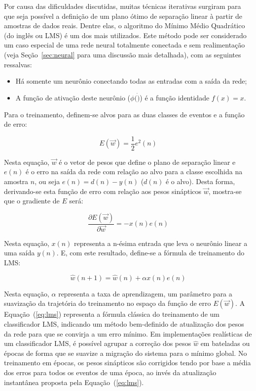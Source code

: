 Por causa das dificuldades discutidas, muitas técnicas iterativas surgiram
para que seja possível a definição de um plano ótimo de separação linear à
partir de amostras de dados reais. Dentre elas, o algoritmo do Mínimo Médio
Quadrático \cite{widrow} (do inglês  ou LMS) é um dos
mais utilizados. Este método pode ser considerado um caso especial de uma rede
neural totalmente conectada e sem realimentação (veja Seção~\ref{sec:neural}
para uma discussão mais detalhada), com as seguintes ressalvas:

\begin{itemize}
\item Há somente um neurônio conectando todas as entradas com a saída da rede;
\item A função de ativação deste neurônio ($\phi(\dot)$) é a função identidade
$f(x) = x$.
\end{itemize}

Para o treinamento, definem-se alvos para as duas classes de eventos e a
função de erro:

\begin{equation}
E(\overrightarrow{w}) = \frac{1}{2} e^2(n)
\label{eq:mse-definition}
\end{equation}

Nesta equação, $\overrightarrow{w}$ é o vetor de pesos que define o plano de
separação linear e $e(n)$ é o erro na saída da rede com relação ao alvo para a
classe escolhida na amostra $n$, ou seja $e(n) = d(n)-y(n)$ ($d(n)$ é o
alvo). Desta forma, derivando-se esta função de erro com relação aos pesos
sinápticos $\overrightarrow{w}$, mostra-se que o gradiente de $E$ será:

\begin{equation}
\frac{\partial E(\overrightarrow{w})}{\partial \overrightarrow{w}} =
-x(n)e(n) 
\end{equation}

Nesta equação, $x(n)$ representa a n-ésima entrada que leva o neurônio linear
a uma saída $y(n)$. E, com este resultado, define-se a fórmula de treinamento
do LMS:

\begin{equation}
\hat{w}(n+1) = \hat{w}(n) + \alpha x(n)e(n)
\label{eq:lms}
\end{equation}

Nesta equação, $\alpha$ representa a taxa de aprendizagem, um parâmetro para a
suavização da trajetória do treinamento no espaço da função de erro
$E(\overrightarrow{w})$. A Equação~(\ref{eq:lms}) representa a fórmula
clássica do treinamento de um classificador LMS, indicando um método
bem-definido de atualização dos pesos da rede para que se convirja a um erro
mínimo. Em implementações realísticas de um classificador LMS, é possível
agrupar a correção dos pesos $\hat{w}$ em bateladas ou épocas de forma que se
suavize a migração do sistema para o mínimo global. No treinamento em épocas,
os pesos sinápticos são corrigidos tendo por base a média dos erros para todos
os eventos de uma época, ao invés da atualização instantânea proposta pela
Equação~(\ref{eq:lms}).

